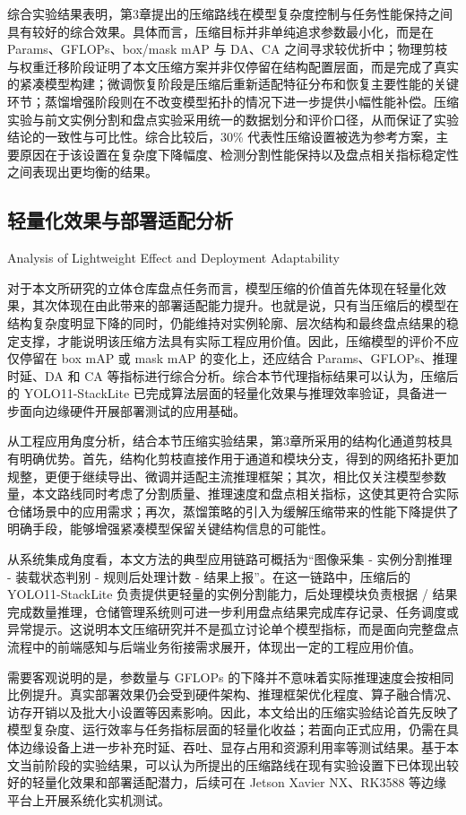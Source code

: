 综合实验结果表明，第3章提出的压缩路线在模型复杂度控制与任务性能保持之间具有较好的综合效果。具体而言，压缩目标并非单纯追求参数最小化，而是在 Params、GFLOPs、box/mask mAP 与 DA、CA 之间寻求较优折中；物理剪枝与权重迁移阶段证明了本文压缩方案并非仅停留在结构配置层面，而是完成了真实的紧凑模型构建；微调恢复阶段是压缩后重新适配特征分布和恢复主要性能的关键环节；蒸馏增强阶段则在不改变模型拓扑的情况下进一步提供小幅性能补偿。压缩实验与前文实例分割和盘点实验采用统一的数据划分和评价口径，从而保证了实验结论的一致性与可比性。综合比较后，30\% 代表性压缩设置被选为参考方案，主要原因在于该设置在复杂度下降幅度、检测分割性能保持以及盘点相关指标稳定性之间表现出更均衡的结果。
\subsection{轻量化效果与部署适配分析}{Analysis of Lightweight Effect and Deployment Adaptability}

对于本文所研究的立体仓库盘点任务而言，模型压缩的价值首先体现在轻量化效果，其次体现在由此带来的部署适配能力提升。也就是说，只有当压缩后的模型在结构复杂度明显下降的同时，仍能维持对实例轮廓、层次结构和最终盘点结果的稳定支撑，才能说明该压缩方法具有实际工程应用价值。因此，压缩模型的评价不应仅停留在 box mAP 或 mask mAP 的变化上，还应结合 Params、GFLOPs、推理时延、DA 和 CA 等指标进行综合分析。综合本节代理指标结果可以认为，压缩后的 YOLO11-StackLite 已完成算法层面的轻量化效果与推理效率验证，具备进一步面向边缘硬件开展部署测试的应用基础。

从工程应用角度分析，结合本节压缩实验结果，第3章所采用的结构化通道剪枝具有明确优势。首先，结构化剪枝直接作用于通道和模块分支，得到的网络拓扑更加规整，更便于继续导出、微调并适配主流推理框架；其次，相比仅关注模型参数量，本文路线同时考虑了分割质量、推理速度和盘点相关指标，这使其更符合实际仓储场景中的应用需求；再次，蒸馏策略的引入为缓解压缩带来的性能下降提供了明确手段，能够增强紧凑模型保留关键结构信息的可能性。

从系统集成角度看，本文方法的典型应用链路可概括为“图像采集 - 实例分割推理 - 装载状态判别 - 规则后处理计数 - 结果上报”。在这一链路中，压缩后的 YOLO11-StackLite 负责提供更轻量的实例分割能力，后处理模块负责根据 / 结果完成数量推理，仓储管理系统则可进一步利用盘点结果完成库存记录、任务调度或异常提示。这说明本文压缩研究并不是孤立讨论单个模型指标，而是面向完整盘点流程中的前端感知与后端业务衔接需求展开，体现出一定的工程应用价值。

需要客观说明的是，参数量与 GFLOPs 的下降并不意味着实际推理速度会按相同比例提升。真实部署效果仍会受到硬件架构、推理框架优化程度、算子融合情况、访存开销以及批大小设置等因素影响。因此，本文给出的压缩实验结论首先反映了模型复杂度、运行效率与任务指标层面的轻量化收益；若面向正式应用，仍需在具体边缘设备上进一步补充时延、吞吐、显存占用和资源利用率等测试结果。基于本文当前阶段的实验结果，可以认为所提出的压缩路线在现有实验设置下已体现出较好的轻量化效果和部署适配潜力，后续可在 Jetson Xavier NX、RK3588 等边缘平台上开展系统化实机测试。

